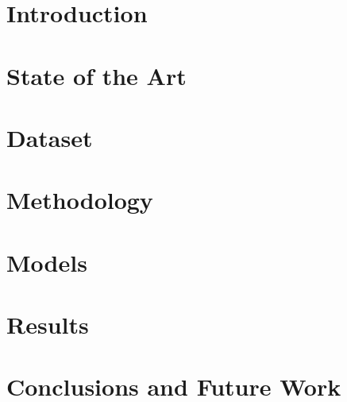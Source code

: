 \documentclass[runningheads]{llncs}
\begin{document}
\section{Introduction}
\label{sec:intro}


\section{State of the Art}
\label{sec:related}


\section{Dataset}
\label{sec:data}


\section{Methodology}
\label{sec:method}


\section{Models}
\label{sec:models}


\section{Results}
\label{sec:results}


\section{Conclusions and Future Work}
\label{sec:conclusions}




\end{document}
